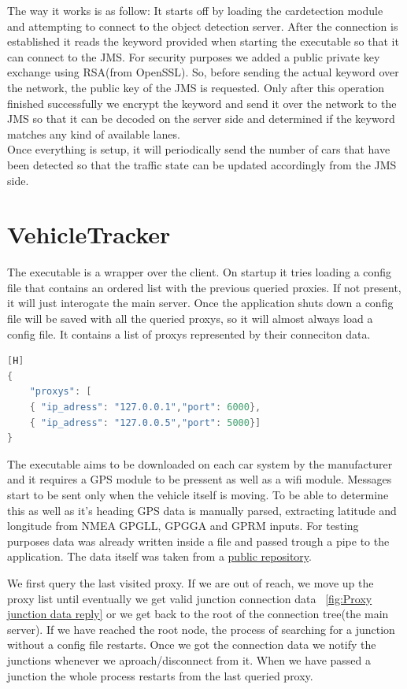 \documentclass[17pt]{report}
\begin{document}
\indent
The way it works is as follow: It starts off by loading the cardetection module and attempting to 
connect to the object detection server. After the connection is 
established it reads the keyword provided when starting the executable 
so that it can connect to the JMS. For security purposes we added a 
public private key exchange using RSA(from OpenSSL). So, before sending 
the actual keyword over the network, the public key of the JMS is 
requested. Only after this operation finished successfully we encrypt 
the keyword and send it over the network to the JMS so that it can be 
decoded on the server side and determined if the keyword matches any 
kind of available lanes.\\
\indent
Once everything is setup, it will periodically
send the number of cars that have been detected so that the traffic state
can be updated accordingly from the JMS side.

\pagebreak
\section{VehicleTracker}
\indent \indent
The executable is a wrapper over the client. On startup it tries loading a
config file that contains an ordered list with the previous queried proxies.
If not present, it will just interogate the main server. Once the application
shuts down a config file will be saved with all the queried proxys, so it will
almost always load a config file. It contains a list of proxys represented by
their conneciton data.

\begin{lstlisting}[language = C++][H]
{
    "proxys": [
    { "ip_adress": "127.0.0.1","port": 6000},
    { "ip_adress": "127.0.0.5","port": 5000}]
}
\end{lstlisting}

The executable aims to be downloaded on each car system by the manufacturer
and it requires a GPS module to be pressent as well as a wifi module. Messages
start to be sent only when the vehicle itself is moving. To be able to
determine this as well as it's heading GPS data is manually parsed, extracting
latitude and longitude from NMEA GPGLL, GPGGA and GPRM inputs. For testing
purposes data was already written inside a file and passed trough a pipe to the
application. The data itself was taken from a \href{https://github.com/ChrisvdHoorn/NMEA_message_GPS_data}{public repository}.

\indent \indent
We first query the last visited proxy. If we are out of reach, we move up the proxy list
until eventually we get valid junction connection data ~\ref{fig:Proxy junction data reply} or we get back to
the root of the connection tree(the main server). If we have reached the root node, 
the process of searching for a junction without a config file restarts. Once we got the 
connection data we notify the junctions whenever we aproach/disconnect from it. When we 
have passed a junction the whole process restarts from the last queried proxy.
\end{document}
